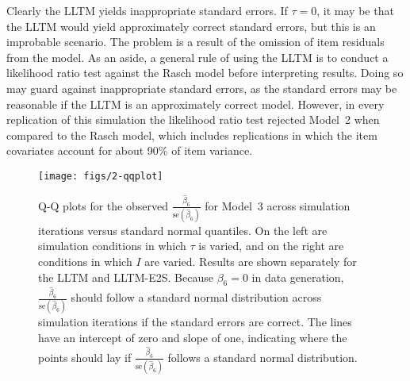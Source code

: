 Clearly the LLTM yields inappropriate standard errors. If $\tau = 0$, it may be that the LLTM would yield approximately correct standard errors, but this is an improbable scenario. The problem is a result of the omission of item residuals from the model. As an aside, a general rule of using the LLTM is to conduct a likelihood ratio test against the Rasch model before interpreting results. Doing so may guard against inappropriate standard errors, as the standard errors may be reasonable if the LLTM is an approximately correct model. However, in every replication of this simulation the likelihood ratio test rejected Model~2 when compared to the Rasch model, which includes replications in which the item covariates account for about 90\% of item variance.

\begin{figure}
	\centering
	\texttt{[image: figs/2-qqplot]}
	\caption{Q-Q plots for the observed $\frac{\hat \beta_6}{\mathrm{se}(\hat \beta_6)}$ for Model~3 across simulation iterations versus standard normal quantiles. On the left are simulation conditions in which $\tau$ is varied, and on the right are conditions in which $I$ are varied. Results are shown separately for the LLTM and LLTM-E2S. Because $\beta_6 = 0$ in data generation, $\frac{\hat \beta_6}{\mathrm{se}(\hat \beta_6)}$ should follow a standard normal distribution across simulation iterations if the standard errors are correct. The lines have an intercept of zero and slope of one, indicating where the points should lay if $\frac{\hat \beta_6}{\mathrm{se}(\hat \beta_6)}$ follows a standard normal distribution.}
	\label{fig:2-qqplot}
\end{figure}

%



